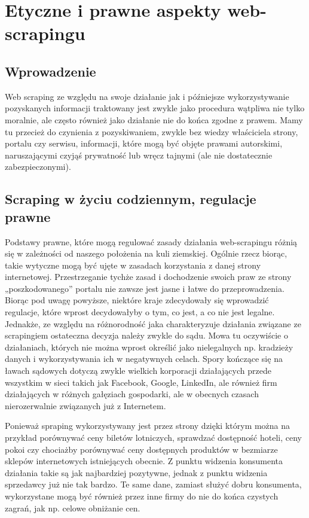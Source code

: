\chapter{Etyczne i prawne aspekty web-scrapingu}

\section{Wprowadzenie}

	Web scraping ze względu na swoje działanie jak i późniejsze wykorzystywanie pozyskanych informacji traktowany jest zwykle jako procedura wątpliwa nie tylko moralnie, ale często również jako działanie nie do końca zgodne z prawem. Mamy tu przecież do czynienia z pozyskiwaniem, zwykle bez wiedzy właściciela strony, portalu czy serwisu, informacji, które mogą być objęte prawami autorskimi, naruszającymi czyjąś prywatność lub wręcz tajnymi (ale nie dostatecznie zabezpieczonymi).

\section{Scraping w życiu codziennym, regulacje prawne}

Podstawy prawne, które mogą regulować zasady działania web-scrapingu różnią się w zależności od naszego położenia na kuli ziemskiej. Ogólnie rzecz biorąc, takie wytyczne mogą być ujęte w zasadach korzystania z danej strony internetowej. Przestrzeganie tychże zasad i dochodzenie swoich praw ze strony „poszkodowanego” portalu nie zawsze jest jasne i łatwe do przeprowadzenia. Biorąc pod uwagę powyższe, niektóre kraje zdecydowały się wprowadzić regulacje, które wprost decydowałyby o tym, co jest, a co nie jest legalne. Jednakże, ze względu na różnorodność jaka charakteryzuje działania związane ze scrapingiem ostateczna decyzja należy zwykle do sądu. Mowa tu oczywiście o działaniach, których nie można wprost określić jako nielegalnych np. kradzieży danych i wykorzystywania ich w negatywnych celach. Spory kończące się na ławach sądowych dotyczą zwykle wielkich korporacji działających przede wszystkim w sieci takich jak Facebook, Google, LinkedIn, ale również firm działających w różnych gałęziach gospodarki, ale w obecnych czasach nierozerwalnie związanych już z Internetem. 
	
Ponieważ spraping wykorzystywany jest przez strony dzięki którym można na przykład porównywać ceny biletów lotniczych, sprawdzać dostępność hoteli, ceny pokoi czy chociażby porównywać ceny dostępnych produktów w bezmiarze sklepów internetowych istniejących obecnie. Z punktu widzenia konsumenta działania takie są jak najbardziej pozytywne, jednak z punktu widzenia sprzedawcy już nie tak bardzo. Te same dane, zamiast służyć dobru konsumenta, wykorzystane mogą być również przez inne firmy do nie do końca czystych zagrań, jak np. celowe obniżanie cen. 


